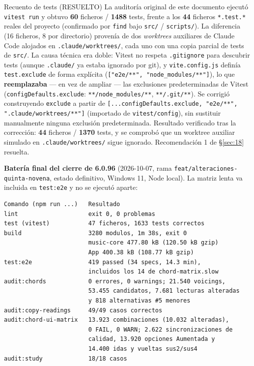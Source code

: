 \documentclass[a4paper,11pt,oneside]{report}
\newcommand{\Sref}[1]{\S\ref{#1}}
\begin{document}
\begin{hallazgobox}{Recuento de tests (RESUELTO)}
La auditoría original de este documento ejecutó \lstinline!vitest run! y obtuvo \textbf{60} ficheros / \textbf{1488} tests, frente a los \textbf{44} ficheros \lstinline!*.test.*! reales del proyecto (confirmado por \lstinline!find! bajo \lstinline!src/! / \lstinline!scripts/!). La diferencia (16 ficheros, 8 por directorio) provenía de dos \textit{worktrees} auxiliares de Claude Code alojados en \lstinline!.claude/worktrees/!, cada uno con una copia parcial de tests de \lstinline!src/!. La causa técnica era doble: Vitest no respeta \lstinline!.gitignore! para descubrir tests (aunque \lstinline!.claude/! ya estaba ignorado por git), y \lstinline!vite.config.js! definía \lstinline!test.exclude! de forma explícita (\lstinline!["e2e/**", "node_modules/**"]!), lo que \textbf{reemplazaba} --- en vez de ampliar --- las exclusiones predeterminadas de Vitest (\lstinline!configDefaults.exclude!: \lstinline!**/node_modules/**!, \lstinline!**/.git/**!). Se corrigió construyendo \lstinline!exclude! a partir de \lstinline![...configDefaults.exclude, "e2e/**", ".claude/worktrees/**"]! (importado de \lstinline!vitest/config!), sin sustituir manualmente ninguna exclusión predeterminada. Resultado verificado tras la corrección: \textbf{44} ficheros / \textbf{1370} tests, y se comprobó que un worktree auxiliar simulado en \lstinline!.claude/worktrees/! sigue ignorado. Recomendación 1 de \Sref{sec:18} resuelta.
\end{hallazgobox}

\textbf{Batería final del cierre de 6.0.96} (2026-10-07, rama \lstinline!feat/alteraciones-quinta-novena!, estado definitivo, Windows 11, Node local). La matriz lenta va incluida en \lstinline!test:e2e! y no se ejecutó aparte:

\begin{lstlisting}
Comando (npm run ...)   Resultado
lint                    exit 0, 0 problemas
test (vitest)           47 ficheros, 1633 tests correctos
build                   3280 modulos, 1m 38s, exit 0
                        music-core 477.80 kB (120.50 kB gzip)
                        App 400.38 kB (108.77 kB gzip)
test:e2e                419 passed (34 specs, 14.3 min),
                        incluidos los 14 de chord-matrix.slow
audit:chords            0 errores, 0 warnings; 21.540 voicings,
                        53.455 candidatos, 7.681 lecturas alteradas
                        y 818 alternativas #5 menores
audit:copy-readings     49/49 casos correctos
audit:chord-ui-matrix   13.923 combinaciones (10.032 alteradas),
                        0 FAIL, 0 WARN; 2.622 sincronizaciones de
                        calidad, 13.920 opciones Aumentada y
                        14.400 idas y vueltas sus2/sus4
audit:study             18/18 casos
\end{lstlisting}
\end{document}

